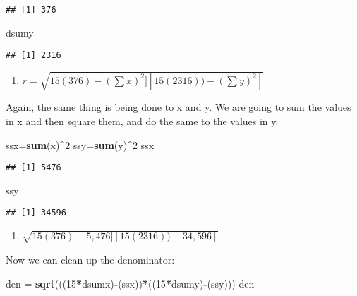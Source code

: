 \documentclass[]{article}
\newenvironment{Shaded}{\begin{snugshade}}{\end{snugshade}}
\newcommand{\KeywordTok}[1]{\textcolor[rgb]{0.13,0.29,0.53}{\textbf{#1}}}
\newcommand{\DecValTok}[1]{\textcolor[rgb]{0.00,0.00,0.81}{#1}}
\newcommand{\StringTok}[1]{\textcolor[rgb]{0.31,0.60,0.02}{#1}}
\newcommand{\OperatorTok}[1]{\textcolor[rgb]{0.81,0.36,0.00}{\textbf{#1}}}
\newcommand{\NormalTok}[1]{#1}
\providecommand{\tightlist}{%
  \setlength{\itemsep}{0pt}\setlength{\parskip}{0pt}}
\begin{document}
\begin{verbatim}
## [1] 376
\end{verbatim}

\begin{Shaded}
\begin{Highlighting}[]
\NormalTok{dsumy}
\end{Highlighting}
\end{Shaded}

\begin{verbatim}
## [1] 2316
\end{verbatim}

\begin{enumerate}
\def\labelenumi{\arabic{enumi}.}
\setcounter{enumi}{5}
\tightlist
\item
  \(r = {\sqrt{15(376)-(\sum x)^2][15(2316))-(\sum y)^2]}}\)
\end{enumerate}

Again, the same thing is being done to x and y. We are going to sum the
values in x and then square them, and do the same to the values in y.

\begin{Shaded}
\begin{Highlighting}[]
\NormalTok{ssx=}\KeywordTok{sum}\NormalTok{(x)}\OperatorTok{^}\DecValTok{2}
\NormalTok{ssy=}\KeywordTok{sum}\NormalTok{(y)}\OperatorTok{^}\DecValTok{2}
\NormalTok{ssx}
\end{Highlighting}
\end{Shaded}

\begin{verbatim}
## [1] 5476
\end{verbatim}

\begin{Shaded}
\begin{Highlighting}[]
\NormalTok{ssy}
\end{Highlighting}
\end{Shaded}

\begin{verbatim}
## [1] 34596
\end{verbatim}

\begin{enumerate}
\def\labelenumi{\arabic{enumi}.}
\setcounter{enumi}{6}
\tightlist
\item
  \({\sqrt{15(376)-5,476][15(2316))-34,596]}}\)
\end{enumerate}

Now we can clean up the denominator:

\begin{Shaded}
\begin{Highlighting}[]
\NormalTok{den =}\StringTok{ }\KeywordTok{sqrt}\NormalTok{(((}\DecValTok{15}\OperatorTok{*}\NormalTok{dsumx)}\OperatorTok{-}\NormalTok{(ssx))}\OperatorTok{*}\NormalTok{((}\DecValTok{15}\OperatorTok{*}\NormalTok{dsumy)}\OperatorTok{-}\NormalTok{(ssy)))}
\NormalTok{den}
\end{Highlighting}
\end{Shaded}
\end{document}
